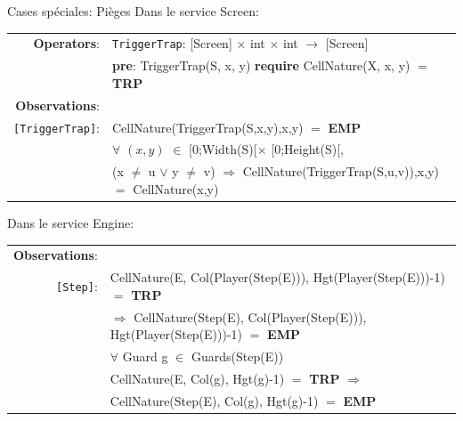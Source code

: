 \documentclass[aspectratio=169]{beamer}
\begin{document}
\begin{frame}{Cases spéciales: Pièges}
  Dans le service \textrm{Screen}:
  \begin{longtable}{rl}
    \textbf{Operators}: & \texttt{TriggerTrap}: \textrm{[Screen]} $\times$ \textrm{int} $\times$ \textrm{int}  $\rightarrow$ \textrm{[Screen]} \\
    & \quad\quad \textbf{pre}: \textrm{TriggerTrap(S, x, y)} \textbf{require} \textrm{CellNature(X, x, y)} $=$ \textbf{TRP}\\
    \textbf{Observations}:&\\
    \texttt{[TriggerTrap]}: & \textrm{CellNature(TriggerTrap(S,x,y),x,y)} $=$ \textbf{EMP} \\
    & $\forall$ $(x,y)$ $\in$ \textrm{[0;Width(S)[}$\times$ \textrm{[0;Height(S)[}, \\
    & \quad\quad (\textrm{x} $\neq$ \textrm{u} $\lor$ \textrm{y} $\neq$ \textrm{v}) $\Rightarrow$ \textrm{CellNature(TriggerTrap(S,u,v)),x,y)} $=$ \textrm{CellNature(x,y)} \\
  \end{longtable}

  Dans le service \textrm{Engine}:
  \begin{longtable}{rl}
    \textbf{Observations}:&\\
    \texttt{[Step]}:& \textrm{CellNature(E, Col(Player(Step(E))), Hgt(Player(Step(E)))-1)} $=$ \textbf{TRP}\\
    & \quad\quad $\Rightarrow$ \textrm{CellNature(Step(E), Col(Player(Step(E))), Hgt(Player(Step(E)))-1)} $=$ \textbf{EMP}\\
    & $\forall$ \textrm{Guard} g $\in$ \textrm{Guards(Step(E))}\\
    & \quad\quad \textrm{CellNature(E, Col(g), Hgt(g)-1)} $=$ \textbf{TRP} $\Rightarrow$\\
    & \quad\quad\quad\quad \textrm{CellNature(Step(E), Col(g), Hgt(g)-1)} $=$ \textbf{EMP}\\
  \end{longtable}
\end{frame}
\end{document}
